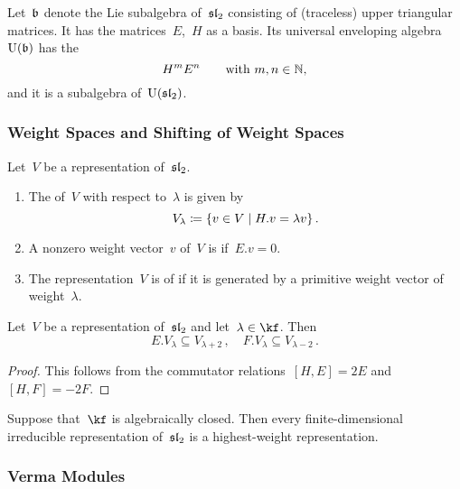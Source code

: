 \documentclass[a4paper, 11pt, oneside]{scrartcl}
\begin{document}
Let~$\mathfrak{b}$ denote the Lie subalgebra of~$\mathfrak{sl}_2$ consisting of (traceless) upper triangular matrices.
It has the matrices~$E$,~$H$ as a basis.
Its universal enveloping algebra~$\operatorname{U}(\mathfrak{b})$ has the~{\PBWbasis}
\[
  H^m E^n
  \qquad
  \text{with $m, n \in \mathbb{N}$,}
\]
and it is a subalgebra of~$\operatorname{U}(\mathfrak{sl}_2)$.

\subsubsection{Weight Spaces and Shifting of Weight Spaces}

\begin{definition}
  Let~$V$ be a representation of~$\mathfrak{sl}_2$.
  \begin{enumerate}
    \item
      The  of~$V$ with respect to~$\lambda$ is given by
      \[
        V_\lambda
        \defined
        \{ v \in V \suchthat H.v = \lambda v \} \,.
      \]
    \item
      A nonzero weight vector~$v$ of~$V$ is  if~$E.v = 0$.
    \item
      The representation~$V$ is of  if it is generated by a primitive weight vector of weight~$\lambda$.
  \end{enumerate}
\end{definition}

\begin{proposition}
  \label{shifting lemma}
  Let~$V$ be a representation of~$\mathfrak{sl}_2$ and let~$\lambda \in \kf$.
  Then
  \[
    E.V_\lambda
    \subseteq
    V_{\lambda + 2} \,,
    \quad
    F.V_\lambda
    \subseteq
    V_{\lambda - 2} \,.
  \]
\end{proposition}

\begin{proof}
  This follows from the commutator relations~$[H,E] = 2E$ and~$[H,F] = -2F$.
\end{proof}

\begin{lemma}
  Suppose that~$\kf$ is algebraically closed.
  Then every finite-dimensional irreducible representation of~$\mathfrak{sl}_2$ is a highest-weight representation.
\end{lemma}

\subsubsection{Verma Modules}
\end{document}
